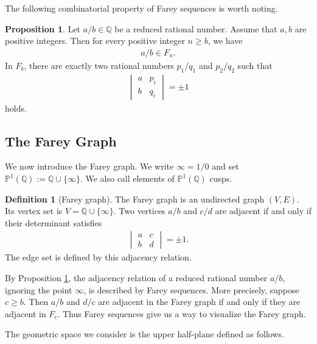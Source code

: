 \documentclass[10pt, a4paper]{article}
\renewcommand{\P}{\mathbb{P}}
\newcommand{\Q}{\mathbb{Q}}
\theoremstyle{definition}
\newtheorem{proposition}[theorem]{Proposition}
\newtheorem{definition}[theorem]{Definition}
\theoremstyle{remark}
\begin{document}
The following combinatorial property of Farey sequences is worth noting.

\begin{proposition} \label{1}
    Let \(a/b\in\Q\) be a reduced rational number. Assume that \(a,b\) are positive integers. Then for every positive integer \(n\ge b\), we have
    \begin{align*}
        a/b\in F_n.
    \end{align*}
    In \(F_b\), there are exactly two rational numbers \(p_1/q_1\) and \(p_2/q_2\) such that
    \begin{align*}
        \begin{vmatrix}
            a & p_i \\
            b & q_i
        \end{vmatrix} = \pm 1
    \end{align*}
    holds.
\end{proposition}

\subsection{The Farey Graph}

We now introduce the Farey graph. We write \(\infty=1/0\) and set
\(\P^1(\Q):=\Q\cup\{\infty\}\). We also call elements of \(\P^1(\Q)\) cusps.

\begin{definition}[Farey graph]
    The Farey graph is an undirected graph \((V,E)\). Its vertex set is
    \(V=\Q\cup\{\infty\}\). Two vertices \(a/b\) and \(c/d\) are adjacent if and only if their determinant satisfies
    \begin{align*}
        \begin{vmatrix}
            a & c \\
            b & d
        \end{vmatrix} = \pm 1.
    \end{align*}
    The edge set is defined by this adjacency relation.
\end{definition}

By Proposition \ref{1}, the adjacency relation of a reduced rational number \(a/b\), ignoring the point \(\infty\), is described by Farey sequences. More precisely, suppose \(c\ge b\). Then \(a/b\) and \(d/c\) are adjacent in the Farey graph if and only if they are adjacent in \(F_c\). Thus Farey sequences give us a way to visualize the Farey graph.

The geometric space we consider is the upper half-plane defined as follows.
\end{document}
